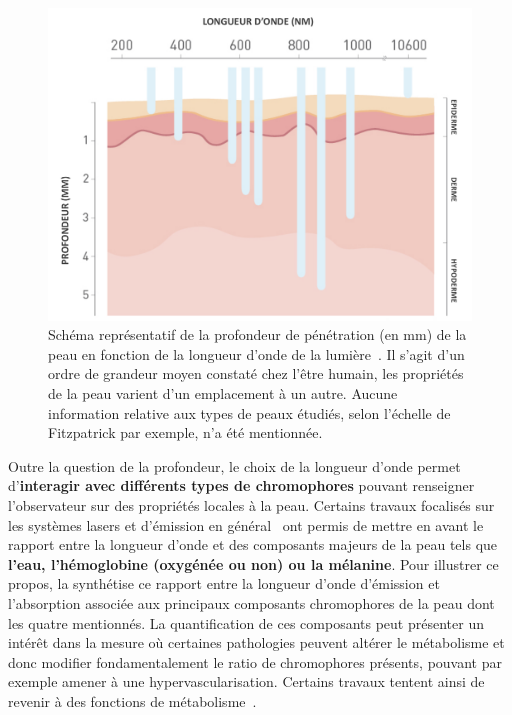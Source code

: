 \begin{figure}[H]
    \centering
    \includegraphics[width=0.95\linewidth]{contents/chapter_2/resources/scheme_light_penatrating.pdf}
    \caption{Schéma représentatif de la profondeur de pénétration (en mm) de la peau en fonction de la longueur d’onde de la lumière~\cite{Barolet2008}. Il s'agit d'un ordre de grandeur moyen constaté chez l'être humain, les propriétés de la peau varient d'un emplacement à un autre. Aucune information relative aux types de peaux étudiés, selon l'échelle de Fitzpatrick par exemple, n'a été mentionnée.}
    \label{fig:scheme_light_penatrating}
\end{figure}\par

Outre la question de la profondeur, le choix de la longueur d'onde permet d'\textbf{interagir avec différents types de chromophores} pouvant renseigner l'observateur sur des propriétés locales à la peau. Certains travaux focalisés sur les systèmes lasers et d'émission en général~\cite{Stewart2013} ont permis de mettre en avant le rapport entre la longueur d'onde et des composants majeurs de la peau tels que \textbf{l'eau, l'hémoglobine (oxygénée ou non) ou la mélanine}. Pour illustrer ce propos, la  synthétise ce rapport entre la longueur d'onde d'émission et l'absorption associée aux principaux composants chromophores de la peau dont les quatre mentionnés. La quantification de ces composants peut présenter un intérêt dans la mesure où certaines pathologies peuvent altérer le métabolisme et donc modifier fondamentalement le ratio de chromophores présents, pouvant par exemple amener à une hypervascularisation. Certains travaux tentent ainsi de revenir à des fonctions de métabolisme~\cite{Im2016}.\par

